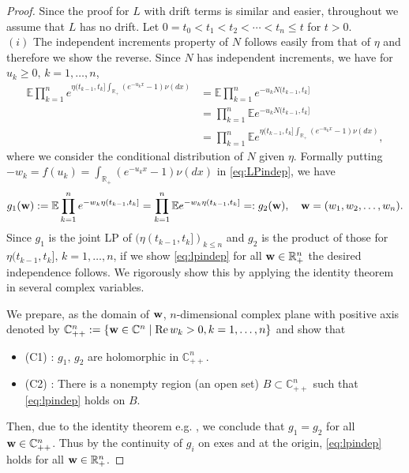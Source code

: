 \documentclass[11pt,leqno%
]{amsart}
\newcommand{\bfw}{{\bf w}}
\newcommand{\R}{\mathbb{R}}
\newcommand{\E }{{\mathbb E}}
\newcommand{\1}{{\mathbf 1}}
\begin{document}
\begin{proof}
 Since the proof for $L$ with drift terms is
 similar and easier, throughout we assume that $L$ has no drift. 
 Let $0=t_0<t_1<t_2<\cdots<t_n \le t$ for $t>0$. \\
$(i)$ The independent increments property of $N$ follows easily from
 that of $\eta$ and therefore we show the reverse. Since $N$ has
 independent increments, we have for $u_k\ge0,\,k=1,\ldots,n$, 
\begin{align}
\label{eq:LPindep}
 \E \prod_{k=1}^n e^{\eta(t_{k-1},t_k]\int_{\R_+} (e^{- u_k x}-1)\nu(dx)} &= 
 \E \prod_{k=1}^n e^{-u_k N(t_{k-1},t_k]}\\
 &= \prod_{k=1}^n \E e^{-u_k N(t_{k-1},t_k]}\nonumber \\
&=\prod_{k=1}^n \E e^{\eta(t_{k-1},t_k]\int_{\R_+} (e^{- u_k x}-1)\nu(dx)}, \nonumber 
\end{align}
where we consider the conditional distribution of $N$ given $\eta$.
Formally putting $-w_k=f(u_k)=\int_{\R_+}(e^{-u_kx}-1)\nu(dx)$ in 
 \eqref{eq:LPindep}, we have 
\begin{align}
\label{eq:lpindep}
 g_1(\bfw) := \E \prod_{k=1}^n e^{-w_k \eta(t_{k-1},t_k]} = \prod_{k=1}^n
 \E e^{-w_k \eta(t_{k-1},t_k]} =: g_2 (\bfw),\quad \bfw=(w_1,w_2,\ldots,w_n).
\end{align}
Since $g_1$ is the joint LP of
 $(\eta(t_{k-1},t_k])_{k\le n}$ and $g_2$ is the product of
 those for $\eta(t_{k-1},t_k],\,k=1,\ldots,n$, if we show
 \eqref{eq:lpindep} for all $\bfw\in \R^n_+$ the desired independence
 follows. We rigorously show this by applying the identity theorem in
 several complex variables. 

 We prepare, as the domain of $\bfw$, $n$-dimensional complex plane with positive
 axis denoted by $\mathbb{C}^n_{++}:=\{\bfw \in \mathbb{C}^n \mid \mathrm{Re}\, w_k >
 0,k=1,\ldots,n\}$ and show that 
\begin{itemize}
 \item (C1) : $g_1,\,g_2$ are holomorphic in $\mathbb{C}^n_{++}$.
 \item (C2) : There is a nonempty region (an open set) $B\subset
 \mathbb{C}^n_{++}$ such that \eqref{eq:lpindep} holds on $B$.  
\end{itemize}
Then, due to the identity theorem e.g. \cite[Theorem
 4.1, Ch.1]{grauert:fritzsche:1976}, we conclude that $g_1=g_2$ for all 
 $\bfw\in \mathbb{C}^n_{++}$. Thus by the continuity of $g_i$  on exes
 and at the origin,
 \eqref{eq:lpindep} holds for all $\bfw\in\R^n_+$. 


\end{proof}
\end{document}
